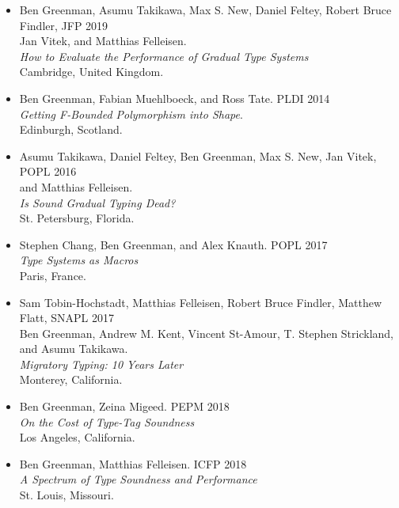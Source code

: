 \documentclass{article}
\begin{document}
\newpage
{}

\begin{itemize}
\item
  Ben Greenman, Asumu Takikawa, Max S. New, Daniel Feltey, Robert Bruce Findler, \hfill JFP 2019 \\
  Jan Vitek, and Matthias Felleisen. \\
  \emph{How to Evaluate the Performance of Gradual Type Systems} \\
  Cambridge, United Kingdom.
\end{itemize}

\begin{itemize}
\item
  Ben Greenman, Fabian Muehlboeck, and Ross Tate. \hfill PLDI 2014 \\
  \emph{Getting F-Bounded Polymorphism into Shape}. \\
  Edinburgh, Scotland.
\item
  Asumu Takikawa, Daniel Feltey, Ben Greenman, Max S. New, Jan Vitek, \hfill POPL 2016 \\
   and Matthias Felleisen. \\
   \emph{Is Sound Gradual Typing Dead?} \\
  St. Petersburg, Florida.
\item
  Stephen Chang, Ben Greenman, and Alex Knauth. \hfill POPL 2017 \\
   \emph{Type Systems as Macros} \\
  Paris, France.
\item
  Sam Tobin-Hochstadt, Matthias Felleisen, Robert Bruce Findler, Matthew Flatt, \hfill SNAPL 2017 \\
  Ben Greenman, Andrew M. Kent, Vincent St-Amour, T. Stephen Strickland, \\
  and Asumu Takikawa. \\
  \emph{Migratory Typing: 10 Years Later} \\
  Monterey, California.
\item
  Ben Greenman, Zeina Migeed. \hfill PEPM 2018 \\
  \emph{On the Cost of Type-Tag Soundness} \\
  Los Angeles, California.
\item
  Ben Greenman, Matthias Felleisen. \hfill ICFP 2018 \\
  \emph{A Spectrum of Type Soundness and Performance} \\
  St. Louis, Missouri.

\end{itemize}
\end{document}
